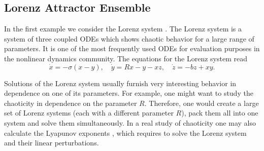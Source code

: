 \documentclass[final]{siamltex}
\begin{document}
%
%

\subsection{Lorenz Attractor Ensemble}

In the first example we consider the Lorenz system \cite{Lorenz-63}. The
Lorenz system is a system of three coupled ODEs which shows chaotic
behavior for a large range of parameters. It is one of the most frequently
used ODEs for evaluation purposes in the nonlinear dynamics community.
The equations for the Lorenz system read
\begin{equation}
    \dot{x} = -\sigma \left( x - y \right), \quad
    \dot{y} = R x - y - xz, \quad
    \dot{z} = -bz + xy.
    \label{eq:lorenz}
\end{equation}

Solutions of the Lorenz system usually furnish very interesting
behavior in dependence on one of its parameters.  For example, one
might want to study the chaoticity in dependence on the parameter
$R$. Therefore, one would create a large set of Lorenz systems (each
with a different parameter $R$), pack them all into one system and
solve them simultaneously. In a real study of chaoticity one
may also calculate the Lyapunov exponents \cite{Ott-book-02}, which
requires to solve the Lorenz system and their linear perturbations.
\end{document}

